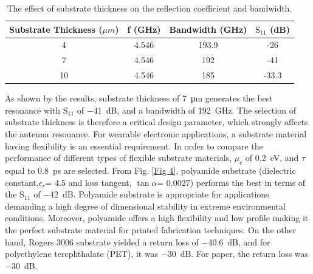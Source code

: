 \documentclass[12pt]{suhbook}
\begin{document}
% 
% 
\begin{table}[hbt!]
\centering
 \begin{tabular}{|c |c |c |c|} 
 \hline
Substrate Thickness ($\mu m$) & f (GHz) & Bandwidth (GHz) &  $\mathrm{S_{11}}$ (dB) \\ [0.5ex] 
 \hline
4 & 4.546 & 193.9  & -26  \\ 
 \hline
7 & 4.546  & 192  & -41  \\
 \hline
 10 & 4.546  & 185  & -33.3 \\ 
 \hline
\end{tabular}
\caption{The effect of substrate thickness on the reflection coefficient and bandwidth.}
\label{table:2}
\end{table}
% 
As shown by the results, substrate thickness of \SI{7}{\um} generates the best resonance with $\mathrm{S_{11}}$ of \SI{-41}{\dB}, and a bandwidth of \SI{192}{\GHz}. The selection of substrate thickness is therefore a critical design parameter, which strongly affects the antenna resonance. For wearable electronic applications, a substrate material having flexibility is an essential requirement. In order to compare the performance of different types of flexible substrate materials, $\mu_c$ of \SI{0.2}{\eV}, and $\tau$ equal to \SI{0.8}{\ps} are selected. From Fig. \ref{Fig 4}, polyamide substrate (dielectric constant,$ \epsilon_r $= 4.5 and loss tangent, $\tan \alpha $= 0.0027) performs the best in terms of the $\mathrm{S_{11}}$ of \SI{-42}{\dB}. Polyamide substrate is appropriate for applications demanding a high degree of dimensional stability in extreme environmental conditions. Moreover, polyamide offers a high flexibility and low profile making it the perfect substrate material for printed fabrication techniques. On the other hand, Rogers 3006 substrate yielded a return loss of  \SI{-40.6}{\dB}, and for polyethylene terephthalate (PET), it was \SI{-30}{\dB}. For paper, the return loss was \SI{-30}{\dB}. 
\end{document}
